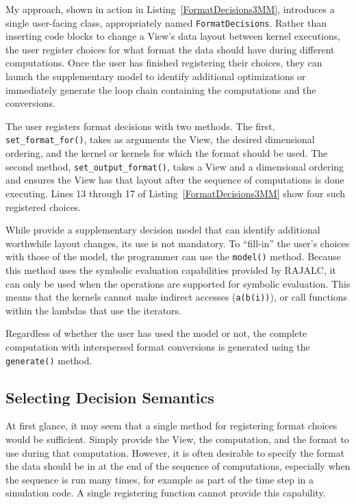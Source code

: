 My approach, shown in action in Listing~\ref{FormatDecisions3MM}, introduces a single user-facing class, appropriately named \verb.FormatDecisions..
Rather than inserting code blocks to change a View's data layout between kernel executions, the user register choices for what format the data should have during different computations. 
Once the user has finished registering their choices, they can launch the supplementary model to identify additional optimizations or immediately generate the loop chain containing the computations and the conversions.

The user registers format decisions with two methods.
The first, \verb.set_format_for()., takes as arguments the View, the desired dimensional ordering, and the kernel or kernels for which the format should be used.
The second method, \verb.set_output_format()., takes a View and a dimensional ordering and ensures the View has that layout after the sequence of computations is done executing.
Lines 13 through 17 of Listing~\ref{FormatDecisions3MM} show four such registered choices.


While \FormatDecisions{} provide a supplementary decision model that can identify additional worthwhile layout changes, its use is not mandatory.
To ``fill-in'' the user's choices with those of the model, the programmer can use the \verb.model(). method.
Because this method uses the symbolic evaluation capabilities provided by RAJALC, it can only be used when the operations are supported for symbolic evaluation.
This means that the kernels cannot make indirect accesses (\verb.a(b(i)).), or call functions within the lambdas that use the iterators.

Regardless of whether the user has used the model or not, 
the complete computation with interspersed format conversions is generated using the \verb.generate(). method.

\subsection{Selecting Decision Semantics}

At first glance, it may seem that a single method for registering format choices would be sufficient. 
Simply provide the View, the computation, and the format to use during that computation.
However, it is often desirable to specify the format the data should be in at the end of the sequence of computations, especially when the sequence is run many times, for example as part of the time step in a simulation code.
A single registering function cannot provide this capability. 

